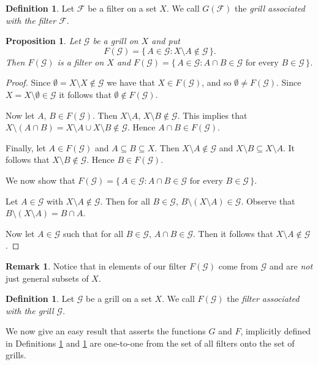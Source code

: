 \documentclass[12pt]{article}
\theoremstyle{plain}
\newtheorem{prop}[thm]{Proposition}
\theoremstyle{definition}
\newtheorem{defn}[thm]{Definition}
\newtheorem{rmk}[thm]{Remark}
\newcommand{\calF}{\mathcal{F}}
\newcommand{\calG}{\mathcal{G}}
\begin{document}
\begin{defn}
  \label{defn:ascGrill}
  Let $\calF$ be a filter on a set $X$.
  We call $G(\calF)$ the \textsl{grill associated with the filter
    $\calF$}.
\end{defn}

\begin{prop}
  Let $\calG$ be a grill on $X$ and put
  \[
    F(\calG) = \{\, A \in \calG  : X \setminus A \not\in \calG \,\}.
  \]
  Then $F(\calG)$ is a filter on $X$ and $F(\calG) = \{\, A \in \calG
  : A \cap B \in \calG \mbox{ for every } B \in \calG \,\}$.
\end{prop}
\begin{proof}
  Since $\emptyset = X \setminus X \not\in \calG$ we have that $X \in
  F(\calG)$, and so $\emptyset \ne F(\calG)$. 
  Since $X = X \setminus \emptyset \in \calG$ it follows that
  $\emptyset \not\in F(\calG)$. 

  Now let $A$, $B \in F(\calG)$. 
  Then $X \setminus A$, $X \setminus B \not\in \calG$.
  This implies that $X \setminus (A \cap B) = X \setminus A \cup X
  \setminus B \not\in \calG$.
  Hence $A \cap B \in F(\calG)$. 

  Finally, let $A \in F(\calG)$ and $A \subseteq B \subseteq X$. 
  Then $X \setminus A \not\in \calG$ and $X \setminus B \subseteq X
  \setminus A$.
  It follows that $X \setminus B \not\in \calG$.
  Hence $B \in F(\calG)$.

  We now show that $F(\calG) = \{\, A \in \calG
  : A \cap B \in \calG \mbox{ for every } B \in \calG \,\}$.

  Let $A \in \calG$ with $X \setminus A \not\in \calG$.
  Then for all $B \in \calG$, $B \setminus (X \setminus A) \in \calG$.
  Observe that $B \setminus ( X \setminus A) = B \cap A$.

  Now let $A \in \calG$ such that for all $B \in \calG$, $A \cap B \in
  \calG$.
  Then it follows that $X \setminus A \not\in \calG$.
\end{proof}
\begin{rmk}
  Notice that in elements of our filter $F(\calG)$ come from $\calG$
  and are \textsl{not} just general subsets of $X$.
\end{rmk}

\begin{defn}
  \label{defn:ascFilt}
  Let $\calG$ be a grill on a set $X$.
  We call $F(\calG)$ the \textsl{filter associated with the grill
    $\calG$}.
\end{defn}

We now give an easy result that asserts the functions $G$ and $F$,
implicitly defined in Definitions \ref{defn:ascGrill} and
\ref{defn:ascFilt} are one-to-one from the set of all filters onto the
set of grills.
\end{document}
